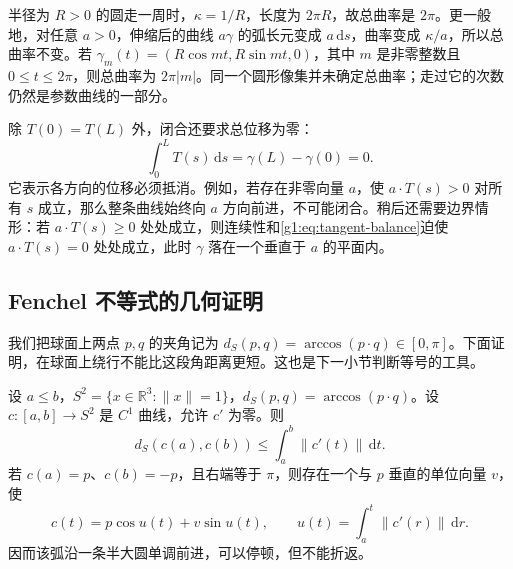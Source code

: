 \begin{example}\label{g1:exm:total-curvature-circle}
	半径为 \(R>0\) 的圆走一周时，\(\kappa=1/R\)，长度为 \(2\pi R\)，故总曲率是 \(2\pi\)。更一般地，对任意 \(a>0\)，伸缩后的曲线 \(a\gamma\) 的弧长元变成 \(a\,\mathrm{d}s\)，曲率变成 \(\kappa/a\)，所以总曲率不变。若 \(\gamma_m(t)=(R\cos mt,R\sin mt,0)\)，其中 \(m\) 是非零整数且 \(0\le t\le2\pi\)，则总曲率为 \(2\pi|m|\)。同一个圆形像集并未确定总曲率；走过它的次数仍然是参数曲线的一部分。
\end{example}

除 \(T(0)=T(L)\) 外，闭合还要求总位移为零：
\begin{equation}\label{g1:eq:tangent-balance}
	\int_0^L T(s)\,\mathrm{d}s=\gamma(L)-\gamma(0)=0.
\end{equation}
它表示各方向的位移必须抵消。例如，若存在非零向量 \(a\)，使 \(a\cdot T(s)>0\) 对所有 \(s\) 成立，那么整条曲线始终向 \(a\) 方向前进，不可能闭合。稍后还需要边界情形：若 \(a\cdot T(s)\ge0\) 处处成立，则连续性和\eqref{g1:eq:tangent-balance}迫使 \(a\cdot T(s)=0\) 处处成立，此时 \(\gamma\) 落在一个垂直于 \(a\) 的平面内。

\subsection{Fenchel 不等式的几何证明}
\label{g1:subsec:0704:02}

我们把球面上两点 \(p,q\) 的夹角记为 \(d_S(p,q)=\arccos(p\cdot q)\in[0,\pi]\)。下面证明，在球面上绕行不能比这段角距离更短。这也是下一小节判断等号的工具。

\begin{lemma}\label{g1:lem:spherical-arc-distance}
	设 \(a\le b\)，\(S^2=\{x\in\mathbb R^3:\|x\|=1\}\)，\(d_S(p,q)=\arccos(p\cdot q)\)。设 \(c:[a,b]\to S^2\) 是 \(C^1\) 曲线，允许 \(c'\) 为零。则
	\[
		d_S(c(a),c(b))\le\int_a^b\|c'(t)\|\,\mathrm{d}t.
	\]
	若 \(c(a)=p\)、\(c(b)=-p\)，且右端等于 \(\pi\)，则存在一个与 \(p\) 垂直的单位向量 \(v\)，使
	\[
		c(t)=p\cos u(t)+v\sin u(t),\qquad
		u(t)=\int_a^t\|c'(r)\|\,\mathrm{d}r.
	\]
	因而该弧沿一条半大圆单调前进，可以停顿，但不能折返。
\end{lemma}


